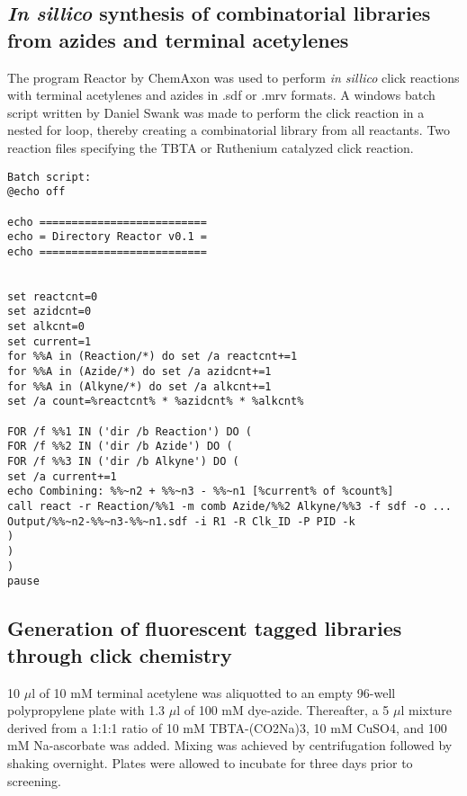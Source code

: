 \subsection{{\it In sillico} synthesis of combinatorial libraries from azides and terminal acetylenes}

The program Reactor by ChemAxon was used to perform {\it in sillico} click reactions with terminal acetylenes and azides in .sdf or .mrv formats. A windows batch script written by Daniel Swank was made to perform the click reaction in a nested for loop, thereby creating a combinatorial library from all reactants. Two reaction files specifying the TBTA or Ruthenium catalyzed click reaction. \\


\clearpage
\begin{verbatim}
Batch script:
@echo off

echo ==========================
echo = Directory Reactor v0.1 =
echo ==========================


set reactcnt=0
set azidcnt=0
set alkcnt=0
set current=1
for %%A in (Reaction/*) do set /a reactcnt+=1
for %%A in (Azide/*) do set /a azidcnt+=1
for %%A in (Alkyne/*) do set /a alkcnt+=1
set /a count=%reactcnt% * %azidcnt% * %alkcnt%

FOR /f %%1 IN ('dir /b Reaction') DO (
FOR /f %%2 IN ('dir /b Azide') DO (
FOR /f %%3 IN ('dir /b Alkyne') DO (
set /a current+=1
echo Combining: %%~n2 + %%~n3 - %%~n1 [%current% of %count%]
call react -r Reaction/%%1 -m comb Azide/%%2 Alkyne/%%3 -f sdf -o ...
Output/%%~n2-%%~n3-%%~n1.sdf -i R1 -R Clk_ID -P PID -k
)
)
)
pause
\end{verbatim}

\clearpage

\subsection{Generation of fluorescent tagged libraries through click chemistry}

10 $\mu$l of 10 mM terminal acetylene was aliquotted to an empty 96-well polypropylene plate with 1.3 $\mu$l of 100 mM dye-azide. Thereafter, a 5 $\mu$l mixture derived from a 1:1:1 ratio of 10 mM TBTA-(CO2Na)3, 10 mM CuSO4, and 100 mM Na-ascorbate was added. Mixing was achieved by centrifugation followed by shaking overnight. Plates were allowed to incubate for three days prior to screening.


